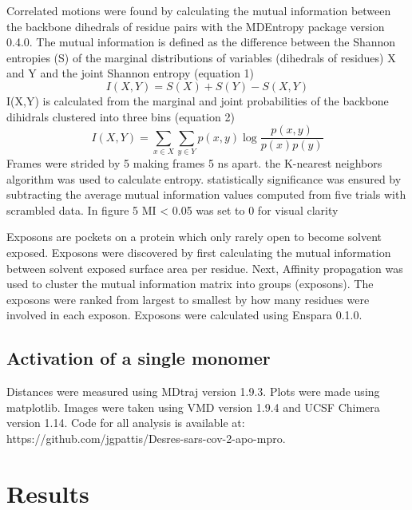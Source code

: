 \documentclass{biophys-new}
\begin{document}
Correlated motions were found by calculating the mutual information between the backbone dihedrals of residue pairs with the MDEntropy package version 0.4.0.\cite{mdentropy} The mutual information is defined as the difference between the Shannon entropies (S) of the marginal distributions of variables (dihedrals of residues) X and Y and the joint Shannon entropy (equation 1)
\begin{equation}
I(X, Y)=S(X)+S(Y)-S(X, Y)
\end{equation}
I(X,Y) is calculated from the marginal and joint probabilities of the backbone dihidrals clustered into three bins (equation 2)
\begin{equation}
I(X, Y)=\sum_{x \in X} \sum_{y \in Y} p(x, y) \log \frac{p(x, y)}{p(x) p(y)}
\end{equation}
Frames were strided by 5 making frames 5 ns apart. the K-nearest neighbors algorithm was used to calculate entropy. statistically significance was ensured by subtracting the average mutual information values computed from five trials with scrambled data. In figure 5 MI < 0.05 was set to 0 for visual clarity

Exposons are pockets on a protein which only rarely open to become solvent exposed.\cite{porter2019cooperative, cruz2020discovery} Exposons were discovered by first calculating the mutual information between solvent exposed surface area per residue. Next, Affinity propagation was used to cluster the mutual information matrix into groups (exposons). The exposons were ranked from largest to smallest by how many residues were involved in each exposon. Exposons were calculated using Enspara 0.1.0.\cite{porter2019enspara}

\subsection*{Activation of a single monomer}

Distances were measured using MDtraj version 1.9.3.\cite{McGibbon2015MDTraj} Plots were made using matplotlib.\cite{Hunter:2007} Images were taken using VMD version 1.9.4\cite{HUMP96} and UCSF Chimera version 1.14.\cite{pettersen2004ucsf} Code for all analysis is available at: https://github.com/jgpattis/Desres-sars-cov-2-apo-mpro.

\section*{Results}
\end{document}
